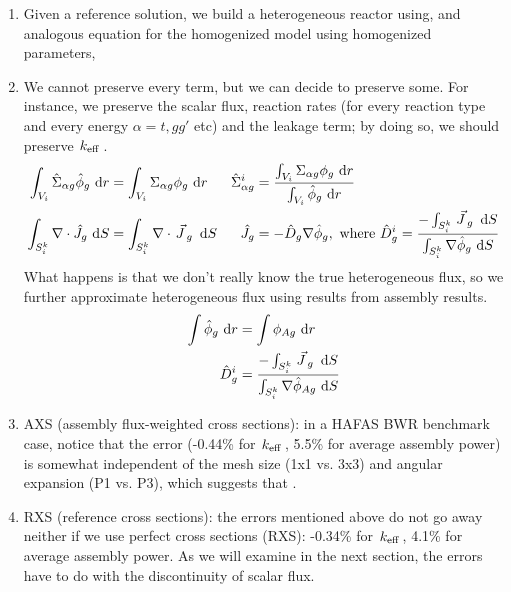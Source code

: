 \documentclass{school-22.211-notes}
\begin{document}
\begin{enumerate}
\item Given a reference solution, we build a heterogeneous reactor using,
and analogous equation for the homogenized model using homogenized parameters,

\item We cannot preserve every term, but we can decide to preserve some. For instance, we preserve the scalar flux, reaction rates (for every reaction type and every energy $\alpha = t, gg'$ etc) and the leakage term; by doing so, we should preserve $\left. k_{\mathrm{eff}} \right.$. 
\begin{align}
\int_{V_i} \hat{\Sigma}_{\alpha g} \hat{\phi}_g \mbox{ }\mathrm{d} r &= \int_{V_i} \Sigma_{\alpha g} \phi_g \mbox{ }\mathrm{d} r  & \hat{\Sigma}_{\alpha g}^i &= \frac{\int_{V_i} \Sigma_{\alpha g} \phi_g \mbox{ }\mathrm{d} r}{\int_{V_i} \hat{\phi}_g \mbox{ }\mathrm{d} r} \\
\int_{S_i^k} \nabla \cdot \hat{J}_g \mbox{ }\mathrm{d} S &= \int_{S_i^k} \nabla \cdot \left.\vec{J}\right._g \mbox{ }\mathrm{d} S & \hat{J}_g &= - \hat{D}_g \nabla \hat{\phi}_g, \mbox{ where } \hat{D}_g^i = \frac{-\int_{S_i^k} \left.\vec{J}\right._g \mbox{ }\mathrm{d} S}{\int_{S_i^k} \nabla \hat{\phi}_g \mbox{ }\mathrm{d} S}
\end{align}
What happens is that we don't really know the true heterogeneous flux, so we further approximate heterogeneous flux using results from assembly results.
\begin{align}
\int \hat{\phi}_g \mbox{ }\mathrm{d} r &= \int \phi_{Ag} \mbox{ }\mathrm{d} r  \\
\hat{D}_g^i &= \frac{-\int_{S_i^k} \left.\vec{J}\right._g \mbox{ }\mathrm{d} S}{\int_{S_i^k} \nabla \hat{\phi}_{Ag} \mbox{ }\mathrm{d} S}
\end{align}


\item AXS (assembly flux-weighted cross sections): in a HAFAS BWR benchmark case, notice that the error (-0.44\% for $\left. k_{\mathrm{eff}} \right.$, 5.5\% for average assembly power) is somewhat independent of the mesh size (1x1 vs. 3x3) and angular expansion (P1 vs. P3), which suggests that  . 

\item RXS (reference cross sections): the errors mentioned above do not go away neither if we use perfect cross sections (RXS): -0.34\% for $\left. k_{\mathrm{eff}} \right.$, 4.1\% for average assembly power. As we will examine in the next section, the errors have to do with the discontinuity of scalar flux. 


\end{enumerate}
\end{document}
